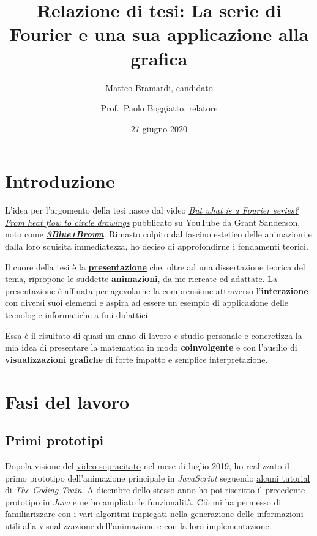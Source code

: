 \documentclass[
]{book}
\title{Relazione di tesi: La serie di Fourier e una sua applicazione alla grafica}
\author{Matteo Bramardi, candidato \and Prof.~Paolo Boggiatto, relatore}
\date{27 giugno 2020}
\begin{document}
\maketitle

{
\setcounter{tocdepth}{1}
\tableofcontents
}
\hypertarget{introduzione}{%
\chapter*{Introduzione}\label{introduzione}}

L'idea per l'argomento della tesi nasce dal video \href{https://www.youtube.com/watch?v=r6sGWTCMz2k}{\emph{But what is a Fourier series? From heat flow to circle drawings}} pubblicato su YouTube da Grant Sanderson, noto come \href{https://www.youtube.com/c/3blue1brown}{\emph{\textbf{3Blue1Brown}}}. Rimasto colpito dal fascino estetico delle animazioni e dalla loro squisita immediatezza, ho deciso di approfondirne i fondamenti teorici.

Il cuore della tesi è la \href{https://bradwave.github.io/thesis}{\textbf{presentazione}} che, oltre ad una dissertazione teorica del tema, ripropone le suddette \textbf{animazioni}, da me ricreate ed adattate. La presentazione è affinata per agevolarne la comprensione attraverso l'\textbf{interazione} con diversi suoi elementi e aspira ad essere un esempio di applicazione delle tecnologie informatiche a fini didattici.

Essa è il risultato di quasi un anno di lavoro e studio personale e concretizza la mia idea di presentare la matematica in modo \textbf{coinvolgente} e con l'ausilio di \textbf{visualizzazioni grafiche} di forte impatto e semplice interpretazione.

\hypertarget{lavoro}{%
\chapter{Fasi del lavoro}\label{lavoro}}

\hypertarget{prototipi}{%
\section{Primi prototipi}\label{prototipi}}

Dopola visione del \href{https://www.youtube.com/watch?v=r6sGWTCMz2k}{video sopracitato} nel mese di luglio 2019, ho realizzato il primo prototipo dell'animazione principale in \emph{JavaScript} seguendo \href{https://www.youtube.com/watch?v=MY4luNgGfms}{alcuni tutorial} di \href{https://www.youtube.com/thecodingtrain}{\emph{The Coding Train}}. A dicembre dello stesso anno ho poi riscritto il precedente prototipo in \emph{Java} e ne ho ampliato le funzionalità. Ciò mi ha permesso di familiarizzare con i vari algoritmi impiegati nella generazione delle informazioni utili alla visualizzazione dell'animazione e con la loro implementazione.
\end{document}
